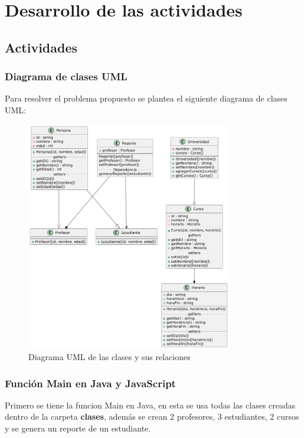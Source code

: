 \section{Desarrollo de las actividades}

\subsection {Actividades}

\subsubsection {Diagrama de clases UML}

Para resolver el problema propuesto se plantea el siguiente diagrama de clases UML:

\begin{figure}[H]
    \centering
    \includegraphics[width=0.8\textwidth]{img/diagrama.png}
    \caption{Diagrama UML de las clases y sus relaciones}
    \label{fig:diagrama_UML}
\end{figure}


\subsubsection {Función Main en Java y JavaScript}

Primero se tiene la funcion Main en Java, en esta se usa todas las clases creadas dentro de la carpeta \textbf{clases}, además se crean 2 profesores, 3 estudiantes, 2 cursos y se genera un reporte de un estudiante.

